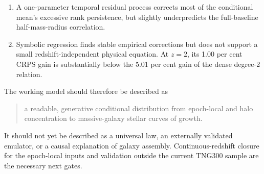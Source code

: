 \begin{enumerate}
  \item A one-parameter temporal residual process corrects most of the
  conditional mean's excessive rank persistence, but slightly underpredicts
  the full-baseline half-mass-radius correlation.

  \item Symbolic regression finds stable empirical corrections but does not
  support a small redshift-independent physical equation. At $z=2$, its 1.00
  per cent CRPS gain is substantially below the 5.01 per cent gain of the dense
  degree-2 relation.
\end{enumerate}

The working model should therefore be described as
\begin{quote}
  a readable, generative conditional distribution from epoch-local \diffmah{}
  and halo concentration to massive-galaxy stellar curves of growth.
\end{quote}
It should not yet be described as a universal law, an externally validated
emulator, or a causal explanation of galaxy assembly. Continuous-redshift
closure for the epoch-local inputs and validation outside the current TNG300
sample are the necessary next gates.
